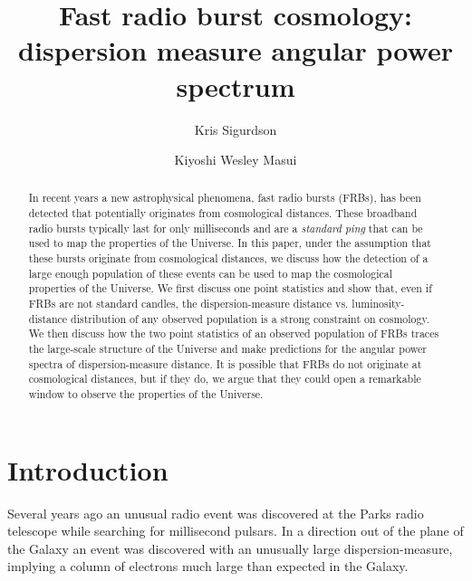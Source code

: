 \documentclass[onecolumn,prd,noshowpacs,nofootinbib,amsmath,amssymb]{revtex4}
\begin{document}
\title{Fast radio burst cosmology: dispersion measure angular power spectrum}

\author{Kris Sigurdson}

\author{Kiyoshi Wesley Masui}




\begin{abstract}
In recent years a new astrophysical phenomena, fast radio bursts (FRBs), has been detected that potentially originates from cosmological distances.  These broadband radio bursts  typically last for only milliseconds and are a \emph{standard ping} that can be used to map the properties of the Universe.  In this paper,  under the assumption that these bursts originate from cosmological distances, we discuss how the detection of a large enough population of these events can be used to map the cosmological properties of the Universe.    We first discuss one point statistics and show that, even if FRBs are not standard candles, the dispersion-measure distance vs. luminosity-distance distribution of any observed population is a strong constraint on cosmology.  We then discuss how the two point statistics of an observed population of FRBs traces the large-scale structure of the Universe and make predictions for the angular power spectra of dispersion-measure distance.  It is possible that FRBs do not originate at cosmological distances, but if they do, we argue that they could open a remarkable window to observe the properties of the Universe.
\end{abstract}

\maketitle

%
%

\section{Introduction}
Several years ago an unusual radio event was discovered at the Parks radio telescope while searching for millisecond pulsars.  In a direction out of the plane of the Galaxy an event was discovered with an unusually large dispersion-measure, implying a column of electrons much large than expected in the Galaxy.
\end{document}
